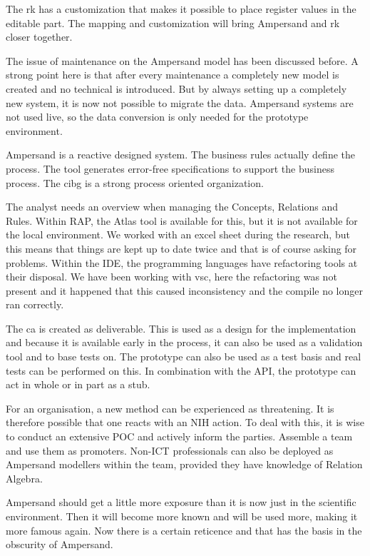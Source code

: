 The \acrshort{rk} has a customization that makes it possible to place register values in the editable part.
The mapping and customization will bring Ampersand and \acrshort{rk} closer together.

The issue of maintenance on the Ampersand model has been discussed before.
A strong point here is that after every maintenance a completely new model is created and no technical is introduced.
But by always setting up a completely new system, it is now not possible to migrate the data.
Ampersand systems are not used live, so the data conversion is only needed for the prototype environment.

Ampersand is a reactive designed system.
The business rules actually define the process.
The tool generates error-free specifications to support the business process.
The \acrshort{cibg} is a strong process oriented organization.

The analyst needs an overview when managing the Concepts, Relations and Rules.
Within RAP, the Atlas tool is available for this, but it is not available for the local environment.
We worked with an excel sheet during the research, but this means that things are kept up to date twice and that is of course asking for problems.
Within the IDE, the programming languages have refactoring tools at their disposal.
We have been working with \acrshort{vsc}, here the refactoring was not present and it happened that this caused inconsistency and the compile no longer ran correctly.

The \acrlong{ca} is created as deliverable.
This is used as a design for the implementation and because it is available early in the process, it can also be used as a validation tool and to base tests on.
The prototype can also be used as a test basis and real tests can be performed on this.
In combination with the API, the prototype can act in whole or in part as a stub.

For an organisation, a new method can be experienced as threatening.
It is therefore possible that one reacts with an NIH action.
To deal with this, it is wise to conduct an extensive POC and actively inform the parties.
Assemble a team and use them as promoters.
Non-ICT professionals can also be deployed as Ampersand modellers within the team, provided they have knowledge of Relation Algebra.

Ampersand should get a little more exposure than it is now just in the scientific environment.
Then it will become more known and will be used more, making it more famous again.
Now there is a certain reticence and that has the basis in the obscurity of Ampersand.

